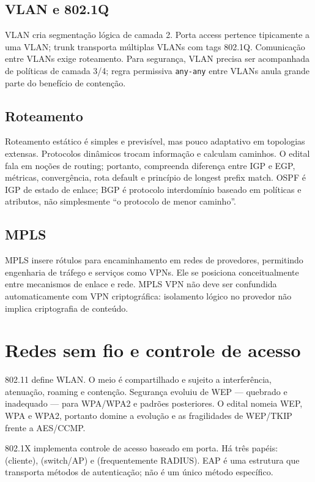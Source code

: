 \subsection{VLAN e 802.1Q}

VLAN cria segmentação lógica de camada 2. Porta access pertence tipicamente a uma VLAN; trunk transporta múltiplas VLANs com tags 802.1Q. Comunicação entre VLANs exige roteamento. Para segurança, VLAN precisa ser acompanhada de políticas de camada 3/4; regra permissiva \texttt{any-any} entre VLANs anula grande parte do benefício de contenção.

\subsection{Roteamento}

Roteamento estático é simples e previsível, mas pouco adaptativo em topologias extensas. Protocolos dinâmicos trocam informação e calculam caminhos. O edital fala em noções de routing; portanto, compreenda diferença entre IGP e EGP, métricas, convergência, rota default e princípio de longest prefix match. OSPF é IGP de estado de enlace; BGP é protocolo interdomínio baseado em políticas e atributos, não simplesmente ``o protocolo de menor caminho''.

\subsection{MPLS}

MPLS insere rótulos para encaminhamento em redes de provedores, permitindo engenharia de tráfego e serviços como VPNs. Ele se posiciona conceitualmente entre mecanismos de enlace e rede. MPLS VPN não deve ser confundida automaticamente com VPN criptográfica: isolamento lógico no provedor não implica criptografia de conteúdo.

\section{Redes sem fio e controle de acesso}

802.11 define WLAN. O meio é compartilhado e sujeito a interferência, atenuação, roaming e contenção. Segurança evoluiu de WEP — quebrado e inadequado — para WPA/WPA2 e padrões posteriores. O edital nomeia WEP, WPA e WPA2, portanto domine a evolução e as fragilidades de WEP/TKIP frente a AES/CCMP.

802.1X implementa controle de acesso baseado em porta. Há três papéis:  (cliente),  (switch/AP) e  (frequentemente RADIUS). EAP é uma estrutura que transporta métodos de autenticação; não é um único método específico.

